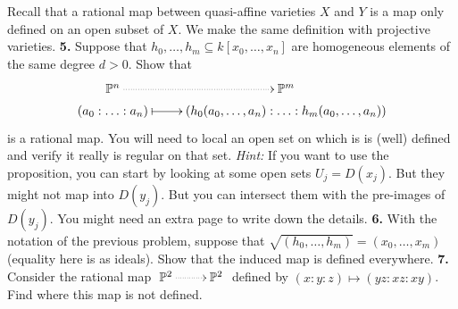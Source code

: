 \documentclass[11pt]{amsart}
\theoremstyle{theorem}
\newcommand{\bP}{\mathbb{P}}
\begin{document}
\vskip 9pt
Recall that a rational map between quasi-affine varieties $X$ and $Y$ is a map only defined on an open subset of $X$.  We make the same definition with projective varieties.  
\vskip 9pt
\noindent
{\bf 5.}  Suppose that $h_0, \dots, h_m \subseteq k[x_0, \dots, x_n]$ are homogeneous elements of the same degree $d > 0$.  Show that
\[
\xymatrix@R=3pt{
\bP^n \ar@{.>}[r] & \bP^m\\
(a_0: \ldots :a_n) \ar@{|->}[r] & (h_0({a_0, \dots, a_n}): \ldots: h_m({a_0, \dots, a_n}))
}
\]
is a rational map.  You will need to local an open set on which is is (well) defined and verify it really is regular on that set.  
\vskip 3pt
\emph{Hint:} If you want to use the proposition, you can start by looking at some open sets $U_{j} = D(x_j)$.  But they might not map into $D(y_j)$.  But you can intersect them with the pre-images of $D(y_j)$.
\vfill
You might need an extra page to write down the details.
\newpage
\noindent
{\bf 6.}  With the notation of the previous problem, suppose that $\sqrt{(h_0, \dots, h_m)} = (x_0, \dots, x_m)$ (equality here is as ideals).  Show that the induced map is defined everywhere.
\vskip 250pt
\noindent
{\bf 7.}  Consider the rational map $\xymatrix{\bP^2 \ar@{.>}[r] & \bP^2}$ defined by $(x : y : z) \mapsto (yz : xz : xy)$.  Find where this map is not defined.  
\end{document}
